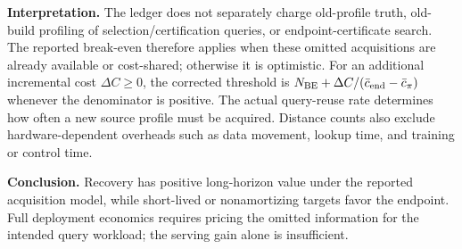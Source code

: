 \textbf{Interpretation.} The ledger does not separately charge old-profile truth, old-build profiling of selection/certification queries, or endpoint-certificate search. The reported break-even therefore applies when these omitted acquisitions are already available or cost-shared; otherwise it is optimistic. For an additional incremental cost $\Delta C\ge0$, the corrected threshold is $N_{\mathrm{BE}}+\Delta C/(\bar c_{\rm end}-\bar c_\pi)$ whenever the denominator is positive. The actual query-reuse rate determines how often a new source profile must be acquired. Distance counts also exclude hardware-dependent overheads such as data movement, lookup time, and training or control time.

\textbf{Conclusion.} Recovery has positive long-horizon value under the reported acquisition model, while short-lived or nonamortizing targets favor the endpoint. Full deployment economics requires pricing the omitted information for the intended query workload; the serving gain alone is insufficient.
